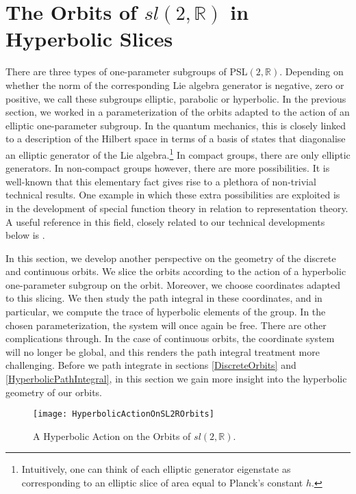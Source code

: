 \documentclass[12pt]{article}
\numberwithin{equation}{section}
\numberwithin{equation}{section}
\numberwithin{table}{section}\setlength{\multlinegap}{25pt}
\begin{document}
\section{\texorpdfstring{The Orbits of $sl(2,\mathbb{R})$ in Hyperbolic Slices}{The Orbits of SL(2,R) in Hyperbolic Slices}}
\label{HyperbolicGeometry}
There are three types of one-parameter subgroups of PSL$(2,\mathbb{R})$. Depending on whether the norm of the corresponding Lie algebra generator is negative, zero or positive, we call these subgroups elliptic, parabolic or hyperbolic. In the previous section, we worked in a parameterization of the orbits adapted to the action of an elliptic one-parameter subgroup. In the quantum mechanics, this is closely linked to a description of the Hilbert space in terms of a basis of states that diagonalise an elliptic generator of the Lie algebra.\footnote{Intuitively, one can think of each elliptic generator eigenstate as corresponding to an elliptic slice of area equal to Planck's constant $h$.} In compact groups, there are only elliptic generators. In non-compact groups however, there are more possibilities. It is well-known that this elementary fact gives rise to a  plethora of non-trivial technical results. One example  in which these extra possibilities are exploited is in the development of special function theory in relation to representation theory. A useful reference in this field, closely related to our technical developments below is \cite{PinkBook}. 

In this section, we  develop another perspective on the geometry of the discrete and continuous orbits. We slice the orbits according to the action of a hyperbolic one-parameter subgroup on the orbit. Moreover, we choose coordinates adapted to this slicing. We then study the path integral in these coordinates, and in particular, we compute the trace of hyperbolic elements of the group. In the chosen parameterization, the system will once again be free. There are other complications through. In the case of continuous orbits, the coordinate system will no longer be global, and this renders the path integral treatment more challenging. Before we path integrate in sections \ref{DiscreteOrbits} and  \ref{HyperbolicPathIntegral}, in this section we gain more insight into the hyperbolic geometry of our orbits. 

\begin{figure}
\begin{center}
\texttt{[image: HyperbolicActionOnSL2ROrbits]}
\end{center}
\caption{A Hyperbolic Action on the Orbits of $sl(2,\mathbb{R})$.}
\label{HyperbolicActionOnSL2ROrbits}
\end{figure}
\end{document}
